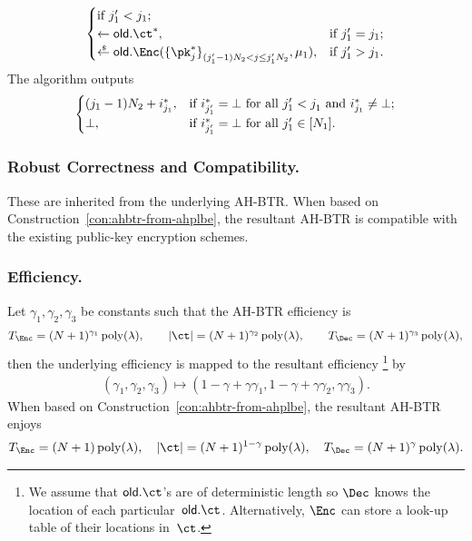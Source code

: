 \begin{construction}
\begin{itemize}
\begin{align*}
\begin{cases}
\textup{if }j_1'<j_1;\\
\gets\OLD.\ct^\ast,&\textup{if }j_1'=j_1;\\
\draws\OLD.\Enc(\smash{\{\pk^\ast_j\}_{(j_1'-1)N_2<j\leq j_1'N_2}^\sphantom},\mu_1),&
\textup{if }j_1'>j_1.
\end{cases}
\end{align*}
The algorithm outputs
\begin{align*}
\begin{cases}
(j_1-1)N_2+i^\ast_{j_1},&\textup{if }
i^\ast_{j_1'}=\bot\textup{ for all }j_1'<j_1^\sphantom
\textup{ and }
i^\ast_{j_1}\neq\bot;\\
\bot,&\textup{if }i^\ast_{j_1'}=\bot\textup{ for all }j_1'\in[N_1].
\end{cases}
\end{align*}
\end{itemize}
\end{construction}

\subsubsection{Robust Correctness and Compatibility.}
These are inherited from the underlying AH-BTR\@.
When based on Construction~\ref{con:ahbtr-from-ahplbe},
the resultant AH-BTR is compatible with the existing public-key encryption schemes.

\subsubsection{Efficiency.}
Let $\gamma_1,\gamma_2,\gamma_3$ be constants such that the AH-BTR efficiency is
\begin{align*}
T_\Enc=(N+1)^{\gamma_1}\poly(\lambda),\qquad
|\ct|=(N+1)^{\gamma_2}\poly(\lambda),\qquad
T_\Dec=(N+1)^{\gamma_3}\poly(\lambda),
\end{align*}
then the underlying efficiency is mapped to the resultant efficiency%
\footnote{We assume that $\OLD.\ct$'s are of deterministic length
so $\Dec$ knows the location of each particular~$\OLD.\ct$.
Alternatively, $\Enc$ can store a look-up table of their locations in~$\ct$.}
by
\begin{align*}
(\gamma_1,\gamma_2,\gamma_3)\mapsto
(1-\gamma+\gamma\gamma_1,1-\gamma+\gamma\gamma_2,\gamma\gamma_3).
\end{align*}
When based on Construction~\ref{con:ahbtr-from-ahplbe},
the resultant AH-BTR enjoys
\begin{align*}
T_\Enc=(N+1)\poly(\lambda),\quad
|\ct|=(N+1)^{1-\gamma}\poly(\lambda),\quad
T_\Dec=(N+1)^\gamma\poly(\lambda).
\end{align*}
